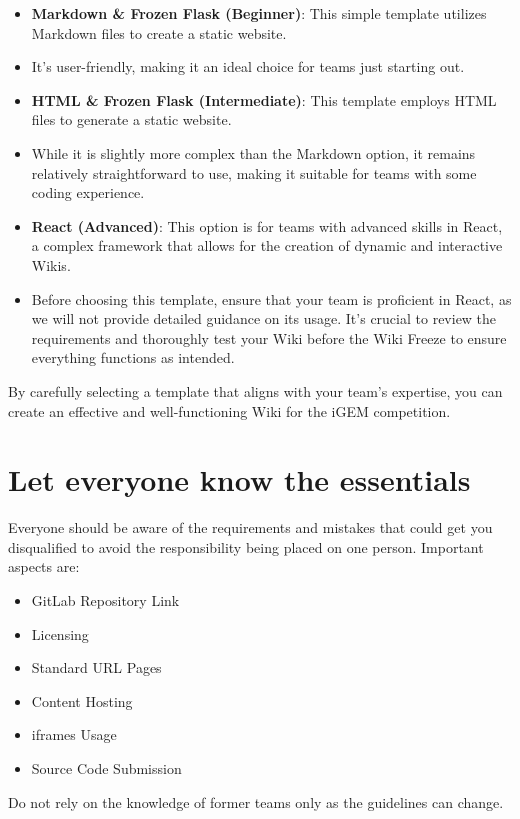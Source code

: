     \begin{itemize}
        \item \textbf{Markdown \& Frozen Flask (Beginner)}: This simple template utilizes Markdown files to create a static website. 
        \item It's user-friendly, making it an ideal choice for teams just starting out.
        \item \textbf{HTML \& Frozen Flask (Intermediate)}: This template employs HTML files to generate a static website. 
        \item While it is slightly more complex than the Markdown option, it remains relatively straightforward to use, making it suitable for teams with some coding experience.
        \item \textbf{React (Advanced)}: This option is for teams with advanced skills in React, a complex framework that allows for the creation of dynamic and interactive Wikis. 
        \item Before choosing this template, ensure that your team is proficient in React, as we will not provide detailed guidance on its usage.
        It’s crucial to review the requirements and thoroughly test your Wiki before the Wiki Freeze to ensure everything functions as intended.
    \end{itemize}
    By carefully selecting a template that aligns with your team's expertise, you can create an effective and well-functioning Wiki for the iGEM competition.

    \section{Let everyone know the essentials } \label{sec:the-essentials}
    Everyone should be aware of the requirements and mistakes that could get you disqualified to avoid the responsibility being placed on one person.
    Important aspects are:
    \begin{itemize}
        \item GitLab Repository Link
        \item Licensing 
        \item Standard URL Pages 
        \item Content Hosting
        \item iframes Usage
        \item Source Code Submission
    \end{itemize}
    Do not rely on the knowledge of former teams only as the guidelines can change.


